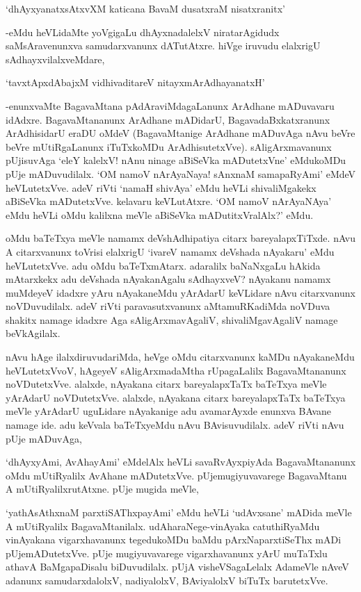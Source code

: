 \begin{shloka}
`dhAyxyanatxsAtxvXM katicana BavaM dusatxraM nisatxranitx'
\end{shloka}

-eMdu heVLidaMte yoVgigaLu dhAyxnadalelxV niratarAgidudx saMsAravenunxva samudarxvanunx dATutAtxre. hiVge iruvudu elalxrigU sAdhayxvilalxveMdare,

\begin{shloka}
`tavxtApxdAbajxM vidhivaditareV nitayxmArAdhayanatxH'
\end{shloka}

-enunxvaMte BagavaMtana pAdAraviMdagaLanunx ArAdhane mADuvavaru idAdxre. BagavaMtananunx ArAdhane mADidarU, BagavadaBxkatxranunx ArAdhisidarU eraDU oMdeV (BagavaMtanige ArAdhane mADuvAga nAvu beVre beVre mUtiRgaLanunx iTuTxkoMDu ArAdhisutetxVve). sAligArxmavanunx pUjisuvAga `eleY kalelxV! nAnu ninage aBiSeVka mADutetxVne' eMdukoMDu pUje mADuvudilalx. `OM namoV nArAyaNaya! sAnxnaM samapaRyAmi' eMdeV heVLutetxVve. adeV riVti `namaH shivAya' eMdu heVLi shivaliMgakekx aBiSeVka mADutetxVve. kelavaru keVLutAtxre. `OM namoV nArAyaNAya' eMdu heVLi oMdu kalilxna meVle aBiSeVka mADutitxVralAlx?' eMdu.

oMdu baTeTxya meVle namamx deVshAdhipatiya citarx bareyalapxTiTxde. nAvu A citarxvanunx toVrisi elalxrigU `ivareV namamx deVshada nAyakaru' eMdu heVLutetxVve. adu oMdu baTeTxmAtarx. adaralilx baNaNxgaLu hAkida mAtarxkekx adu deVshada nAyakanAgalu sAdhayxveV? nAyakanu namamx muMdeyeV idadxre yAru nAyakaneMdu yArAdarU keVLidare nAvu citarxvanunx noVDuvudilalx. adeV riVti paravasutxvanunx aMtamuRKadiMda noVDuva shakitx namage idadxre Aga sAligArxmavAgaliV, shivaliMgavAgaliV namage beVkAgilalx.

nAvu hAge ilalxdiruvudariMda, heVge oMdu citarxvanunx kaMDu nAyakaneMdu heVLutetxVvoV, hAgeyeV sAligArxmadaMtha rUpagaLalilx BagavaMtananunx noVDutetxVve. alalxde, nAyakana citarx bareyalapxTaTx baTeTxya meVle yArAdarU noVDutetxVve. alalxde, nAyakana citarx bareyalapxTaTx baTeTxya meVle yArAdarU uguLidare nAyakanige adu avamarAyxde enunxva BAvane namage ide. adu keVvala baTeTxyeMdu nAvu BAvisuvudilalx. adeV riVti nAvu pUje mADuvAga,

`dhAyxyAmi, AvAhayAmi' eMdelAlx heVLi savaRvAyxpiyAda BagavaMtananunx oMdu mUtiRyalilx AvAhane mADutetxVve. pUjemugiyuvavarege BagavaMtanu A mUtiRyalilxrutAtxne. pUje mugida meVle,

`yathAsAthxnaM parxtiSAThxpayAmi' eMdu heVLi `udAvxsane' mADida meVle A mUtiRyalilx BagavaMtanilalx. udAharaNege-vinAyaka catuthiRyaMdu vinAyakana vigarxhavanunx tegedukoMDu baMdu pArxNaparxtiSeThx mADi pUjemADutetxVve. pUje mugiyuvavarege vigarxhavanunx yArU muTaTxlu athavA BaMgapaDisalu biDuvudilalx. pUjA visheVSagaLelalx AdameVle nAveV adanunx samudarxdalolxV, nadiyalolxV, BAviyalolxV biTuTx barutetxVve.

